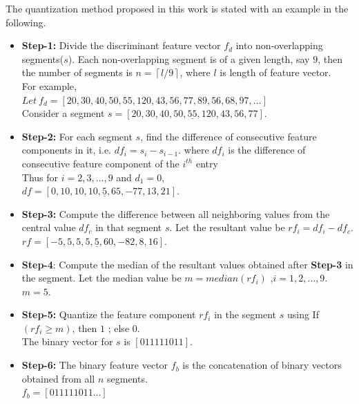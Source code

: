 The quantization method proposed in this work is stated with an example in the
following.
\begin{itemize}
	\item \textbf{Step-1:} Divide the discriminant feature vector $f_{d}$ into
	      non-overlapping segments($s$). Each non-overlapping segment is of
	      a given length, say $9$, then the number of segments is $n=\left \lceil l/9 \right
		      \rceil$, where $l$ is length of feature vector.\\
	      For example,\\
		  $Let~ f_{d}=[20,30,40,50,55,120,43,56,77,89,56,68,97,\ldots]$ \\
	      Consider a segment $s=[20,30,40,50,\underline{55},120,43,56,77]$.
	\item \textbf{Step-2:} For each segment $s$, find the difference of
	      consecutive feature components in it, i.e. $df_{i} = s_{i}-s_{i-1}$. 
		  where $df_{i}$ is the difference of consecutive feature component of the ${i^{th}}$ entry \\
		  Thus for $i=2,3,\ldots,9$ and $d_{1}=0$,\\
	      $df=[0,10,10,10,\underline{5},65,-77,13,21]$.
	\item \textbf{Step-3:} Compute the difference between all neighboring values
	      from the central value $df_{c}$ in that segment $s$. Let the resultant
	      value be $rf_{i}=df_{i}-df_{c}$.\\
	      $rf=[-5,5,5,5,\underline{5},60,-82,8,16]$.
	\item  \textbf{Step-4}: Compute the median of the resultant values obtained
	      after \textbf{Step-3} in the segment. Let the median value be
	      $m=median(rf_{i})$ ,$i=1,2,\ldots,9$.\\
	      $m=5$.
	\item  \textbf{Step-5:} Quantize the feature component $rf_{i}$ in the
	      segment $s$ using 
		  	\subitem If $(rf_{i} \geq m)$, then $1$ ; else $0$.\\
	      The binary vector for $s$ is $[0 1 1 1 1 1 0 1 1]$.
	\item  \textbf{Step-6:} The binary feature vector $f_{b}$ is the
	      concatenation of binary vectors obtained from all $n$ segments.\\
	      $f_{b}=[0 1 1 1 1 1 0 1 1 ...]$\\
\end{itemize}

